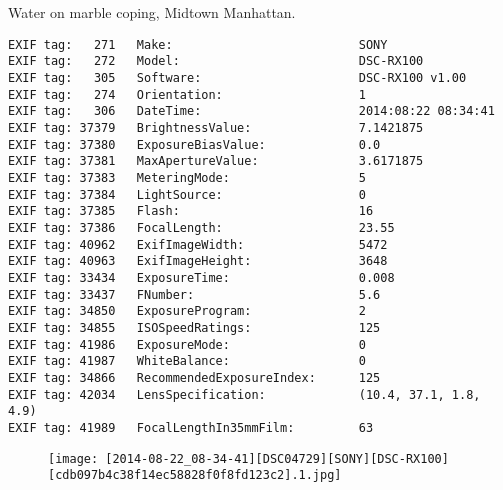 
\clearpage
\section{\protect{}}
\noindent Water on marble coping, Midtown Manhattan.
\noindent
\begin{lstlisting}
EXIF tag:   271   Make:                          SONY
EXIF tag:   272   Model:                         DSC-RX100
EXIF tag:   305   Software:                      DSC-RX100 v1.00
EXIF tag:   274   Orientation:                   1
EXIF tag:   306   DateTime:                      2014:08:22 08:34:41
EXIF tag: 37379   BrightnessValue:               7.1421875
EXIF tag: 37380   ExposureBiasValue:             0.0
EXIF tag: 37381   MaxApertureValue:              3.6171875
EXIF tag: 37383   MeteringMode:                  5
EXIF tag: 37384   LightSource:                   0
EXIF tag: 37385   Flash:                         16
EXIF tag: 37386   FocalLength:                   23.55
EXIF tag: 40962   ExifImageWidth:                5472
EXIF tag: 40963   ExifImageHeight:               3648
EXIF tag: 33434   ExposureTime:                  0.008
EXIF tag: 33437   FNumber:                       5.6
EXIF tag: 34850   ExposureProgram:               2
EXIF tag: 34855   ISOSpeedRatings:               125
EXIF tag: 41986   ExposureMode:                  0
EXIF tag: 41987   WhiteBalance:                  0
EXIF tag: 34866   RecommendedExposureIndex:      125
EXIF tag: 42034   LensSpecification:             (10.4, 37.1, 1.8, 4.9)
EXIF tag: 41989   FocalLengthIn35mmFilm:         63

\end{lstlisting}
\clearpage
\begin{figure}
\raggedleft
\texttt{[image: [2014-08-22\_08-34-41][DSC04729][SONY][DSC-RX100][cdb097b4c38f14ec58828f0f8fd123c2].1.jpg]}
\end{figure}


\clearpage
